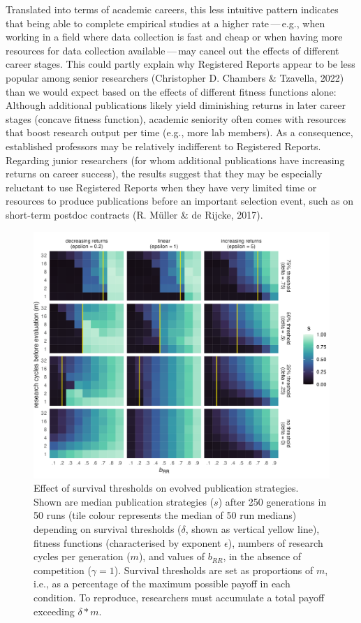 \documentclass[
  ,man,mask,floatsintext]{apa6}
\begin{document}
Translated into terms of academic careers, this less intuitive pattern indicates that
being able to complete empirical studies at a higher rate\(\,\)---\(\,\)e.g., when working in a field where data collection is fast and cheap or when having more resources for data collection available\(\,\)---\(\,\)may cancel out the effects of different career stages.
This could partly explain why Registered Reports appear to be less popular among senior researchers (Christopher D. Chambers \& Tzavella, 2022) than we would expect based on the effects of different fitness functions alone:
Although additional publications likely yield diminishing returns in later career stages (concave fitness function), academic seniority often comes with resources that boost research output per time (e.g., more lab members).
As a consequence, established professors may be relatively indifferent to Registered Reports.
Regarding junior researchers (for whom additional publications have increasing returns on career success), the results suggest that they may be especially reluctant to use Registered Reports when they have very limited time or resources to produce publications before an important selection event, such as on short-term postdoc contracts (R. Müller \& de Rijcke, 2017).



\begin{figure}
\includegraphics[width=1\linewidth]{plots/plot_delta_tile_evo_epsilon_mako} \caption{Effect of survival thresholds on evolved publication strategies. Shown are median publication strategies (\(s\)) after 250 generations in 50 runs (tile colour represents the median of 50 run medians) depending on survival thresholds (\(\delta\), shown as vertical yellow line), fitness functions (characterised by exponent \(\epsilon\)), numbers of research cycles per generation (\(m\)), and values of \(b_{RR}\), in the absence of competition (\(\gamma = 1\)). Survival thresholds are set as proportions of \(m\), i.e., as a percentage of the maximum possible payoff in each condition. To reproduce, researchers must accumulate a total payoff exceeding \(\delta * m\).}\label{fig:deltaplot}
\end{figure}
\end{document}
